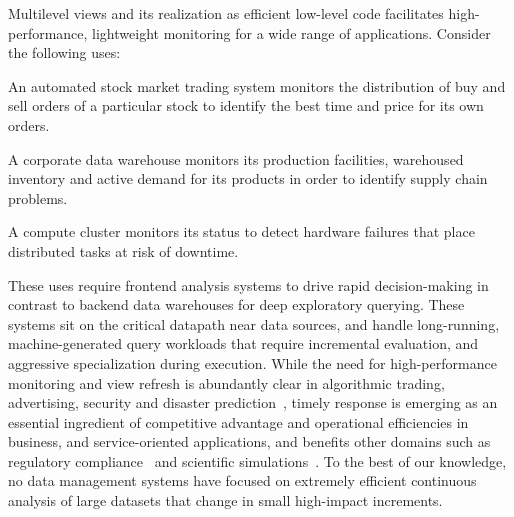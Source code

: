 
Multilevel views and its realization as efficient low-level code
facilitates high-performance, lightweight monitoring for a wide range of
applications. Consider the following uses:

\vspace{-2mm}
\begin{list}{}{ \leftmargin=1em}
\addtolength{\itemsep}{-0.5\baselineskip}
\item An automated stock market trading system monitors the distribution of buy
and sell orders of a particular stock to identify the best time and price for
its own orders.

\item A corporate data warehouse monitors its production facilities, warehoused
inventory and active demand for its products in order to identify
supply chain problems.

\item A compute cluster monitors its status to detect hardware failures
that place distributed tasks at risk of downtime.
\end{list}

\vspace{-1mm}
These uses require frontend analysis systems to drive rapid decision-making in
contrast to backend data warehouses for deep exploratory querying. These systems
sit on the critical datapath near data sources, and handle long-running,
machine-generated query workloads that require incremental evaluation, and
aggressive specialization during execution. While the need for
high-performance monitoring and view refresh is abundantly clear in algorithmic
trading, advertising, security and disaster prediction~\cite{scholz1973earthquake},
timely response is emerging as an essential ingredient of competitive advantage
and operational efficiencies in business, and service-oriented applications, and
benefits other domains such as regulatory compliance~\cite{basel2} and
scientific simulations~\cite{hey2009fourth}. To the best of our knowledge, no
data management systems have focused on extremely efficient continuous analysis
of large datasets that change in small high-impact increments.


